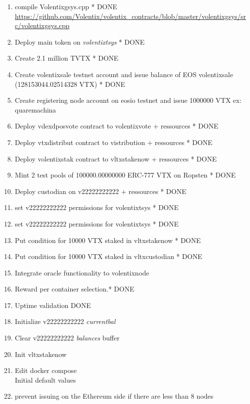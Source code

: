 \documentclass[]{article}
\begin{document}
  		\begin{enumerate}
  			\item compile Volentixgsys.cpp * {\color{green} DONE}\\ 
  			\url{https://github.com/Volentix/volentix_contracts/blob/master/volentixgsys/src/volentixgsys.cpp} 
  		  \item Deploy main token on \textit{volentixtsys} * {\color{green} DONE}
  		  \item Create 2.1 million TVTX * {\color{green} DONE}
  		  \item Create volentixsale testnet account and issue balance of EOS volentixsale (128153044.02514328 VTX) * {\color{green} DONE}
  		   \item Create registering node account on eosio testnet and issue 1000000 VTX ex: quaremachina
  		  \item Deploy vdexdposvote contract to volentixvote + ressources * {\color{green} DONE}
  		  \item Deploy vtxdistribut contract to vistribution + ressources * {\color{green} DONE}
  		  \item Deploy volentixstak  contract to vltxstakenow + ressources * {\color{green} DONE}
 		  \item Mint 2 test pools of 100000.00000000 ERC-777 VTX on Ropsten  * {\color{green} DONE}
		  \item Deploy custodian on v22222222222 + ressources  * {\color{green} DONE}
		  \item set v22222222222 permissions for volentixtsys * {\color{green} DONE}
		  \item set v22222222222 permissions for volentixtsys * {\color{green} DONE}
		  \item Put condition for 10000 VTX staked in vltxstakenow * {\color{green} DONE}
		  \item Put condition for 10000 VTX staked in vltxcustodian  * {\color{green} DONE}
		   \item Integrate oracle functionality to volentixnode
		   \item Reward per container selection.* {\color{yellow} DONE}
		   \item Uptime validation {\color{yellow} DONE}
		  \item Initialize v22222222222 \textit{currentbal}
		  \item Clear v22222222222 \textit{balances} buffer
		  \item Init vltxstakenow
		  \item Edit docker compose\\
		  Initial default values	 
		  \item prevent issuing on the Ethereum side if there are less than 8 nodes
		   
	 \end{enumerate}
\end{document}
